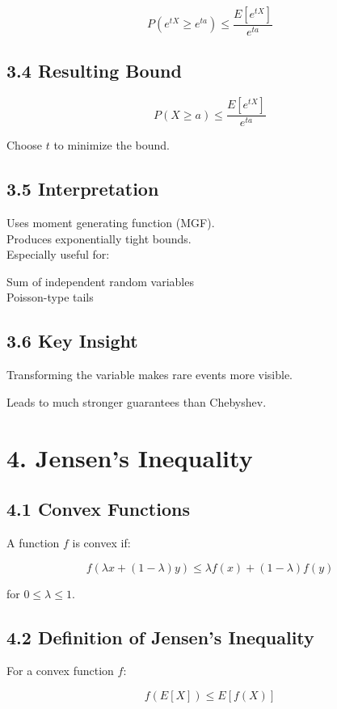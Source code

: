 \documentclass[12pt]{article}
\begin{document}
\[
P (e^{tX} \ge e^{ta}) \le \frac{E[e^{tX}]}{e^{ta}}
\]

\subsection*{3.4 Resulting Bound}

\[
P (X \ge a) \le \frac{E[e^{tX}]}{e^{ta}}
\]

Choose $t$ to minimize the bound.

\subsection*{3.5 Interpretation}

Uses moment generating function (MGF).\\
Produces exponentially tight bounds.\\
Especially useful for:

Sum of independent random variables\\
Poisson-type tails

\subsection*{3.6 Key Insight}

Transforming the variable makes rare events more visible.

Leads to much stronger guarantees than Chebyshev.

\section*{4. Jensen’s Inequality}

\subsection*{4.1 Convex Functions}

A function $f$ is convex if:

\[
f(\lambda x + (1 - \lambda)y) \le \lambda f(x) + (1 - \lambda)f(y)
\]

for $0 \le \lambda \le 1$.

\subsection*{4.2 Definition of Jensen’s Inequality}

For a convex function $f$:

\[
f(E[X]) \le E[f(X)]
\]
\end{document}
